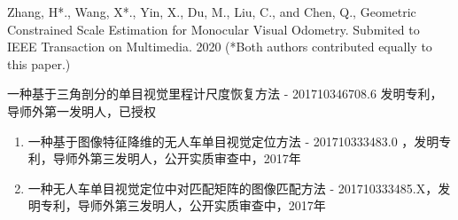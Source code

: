 \begin{enumerate}[{[}1{]}]
  \item Zhang, H*.,  Wang, X*., Yin, X., Du, M., Liu, C., and Chen, Q., Geometric Constrained Scale Estimation for Monocular Visual Odometry.
  Submited to IEEE Transaction on Multimedia. 2020 (*Both authors contributed equally to this paper.)
\end{enumerate}
\begin{enumerate}[{[}1{]}]
\item 一种基于三角剖分的单目视觉里程计尺度恢复方法 - 201710346708.6 发明专利，导师外第一发明人，已授权 
\end{enumerate}
\begin{enumerate}
  \item 一种基于图像特征降维的无人车单目视觉定位方法 - 201710333483.0 ，发明专利，导师外第三发明人，公开实质审查中，2017年
  \item 一种无人车单目视觉定位中对匹配矩阵的图像匹配方法 - 201710333485.X，发明专利，导师外第三发明人，公开实质审查中，2017年
\end{enumerate}


